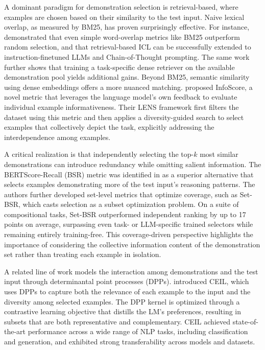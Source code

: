 \documentclass[11pt]{article}
\begin{document}
A dominant paradigm for demonstration selection is retrieval-based, where examples are chosen based on their similarity to the test input. Naive lexical overlap, as measured by BM25, has proven surprisingly effective. For instance, \cite{ref67} demonstrated that even simple word-overlap metrics like BM25 outperform random selection, and that retrieval-based ICL can be successfully extended to instruction-finetuned LLMs and Chain-of-Thought prompting. The same work further shows that training a task-specific dense retriever on the available demonstration pool yields additional gains. Beyond BM25, semantic similarity using dense embeddings offers a more nuanced matching. \cite{ref68} proposed InfoScore, a novel metric that leverages the language model's own feedback to evaluate individual example informativeness. Their LENS framework first filters the dataset using this metric and then applies a diversity-guided search to select examples that collectively depict the task, explicitly addressing the interdependence among examples.

A critical realization is that independently selecting the top-\(k\) most similar demonstrations can introduce redundancy while omitting salient information. The BERTScore-Recall (BSR) metric was identified in \cite{ref69} as a superior alternative that selects examples demonstrating more of the test input's reasoning patterns. The authors further developed set-level metrics that optimize coverage, such as Set-BSR, which casts selection as a subset optimization problem. On a suite of compositional tasks, Set-BSR outperformed independent ranking by up to 17 points on average, surpassing even task- or LLM-specific trained selectors while remaining entirely training-free. This coverage-driven perspective highlights the importance of considering the collective information content of the demonstration set rather than treating each example in isolation.

A related line of work models the interaction among demonstrations and the test input through determinantal point processes (DPPs). \cite{ref70} introduced CEIL, which uses DPPs to capture both the relevance of each example to the input and the diversity among selected examples. The DPP kernel is optimized through a contrastive learning objective that distills the LM's preferences, resulting in subsets that are both representative and complementary. CEIL achieved state-of-the-art performance across a wide range of NLP tasks, including classification and generation, and exhibited strong transferability across models and datasets.
\end{document}
